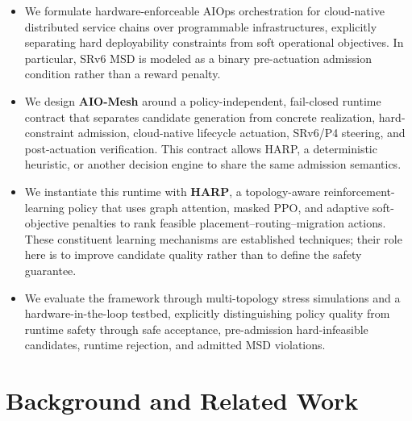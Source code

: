 \documentclass[final,5p]{elsarticle}
\newenvironment{revision}{\color{red}}{}
\begin{document}
\begin{revision}
\begin{itemize}
\item We formulate hardware-enforceable AIOps orchestration for cloud-native distributed service chains over programmable infrastructures, explicitly separating hard deployability constraints from soft operational objectives. In particular, SRv6 MSD is modeled as a binary pre-actuation admission condition rather than a reward penalty.
\item We design \textbf{AIO-Mesh} around a policy-independent, fail-closed runtime contract that separates candidate generation from concrete realization, hard-constraint admission, cloud-native lifecycle actuation, SRv6/P4 steering, and post-actuation verification. This contract allows HARP, a deterministic heuristic, or another decision engine to share the same admission semantics.
\item We instantiate this runtime with \textbf{HARP}, a topology-aware reinforcement-learning policy that uses graph attention, masked PPO, and adaptive soft-objective penalties to rank feasible placement--routing--migration actions. These constituent learning mechanisms are established techniques; their role here is to improve candidate quality rather than to define the safety guarantee.
\item We evaluate the framework through multi-topology stress simulations and a hardware-in-the-loop testbed, explicitly distinguishing policy quality from runtime safety through safe acceptance, pre-admission hard-infeasible candidates, runtime rejection, and admitted MSD violations.
\end{itemize}
\end{revision}




\section{Background and Related Work}
\label{sec:related}
\end{document}
